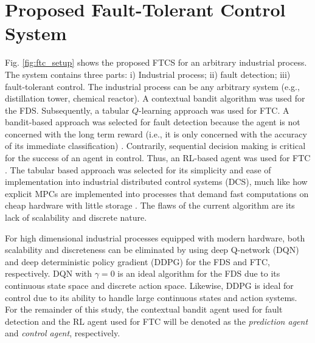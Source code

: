 \section{Proposed Fault-Tolerant Control System}

Fig. \ref{fig:ftc_setup} shows the proposed FTCS for an arbitrary industrial process. The system contains three parts: i) Industrial process; ii) fault detection; iii) fault-tolerant control. The industrial process can be any arbitrary system (e.g., distillation tower, chemical reactor). A contextual bandit algorithm was used for the FDS. Subsequently, a tabular $Q$-learning approach was used for FTC. A bandit-based approach was selected for fault detection because the agent is not concerned with the long term reward (i.e., it is only concerned with the accuracy of its immediate classification) \cite{sutton}.  Contrarily, sequential decision making is critical for the success of an agent in control.  Thus, an RL-based agent was used for FTC \cite{bandits_ref9}. The tabular based approach was selected for its simplicity and ease of implementation into industrial distributed control systems (DCS), much like how explicit MPCs are implemented into processes that demand fast computations on cheap hardware with little storage \cite{explicit_MPC}. The flaws of the current algorithm are its lack of scalability and discrete nature.

For high dimensional industrial processes equipped with modern hardware, both scalability and discreteness can be eliminated by using deep Q-network (DQN) and deep deterministic policy gradient (DDPG) for the FDS and FTC, respectively.  DQN with $\gamma = 0$ is an ideal algorithm for the FDS due to its continuous state space and discrete action space. Likewise, DDPG is ideal for control due to its ability to handle large continuous states and action systems. For the remainder of this study, the contextual bandit agent used for fault detection and the RL agent used for FTC will be denoted as the \textit{prediction agent} and \textit{control agent}, respectively.

